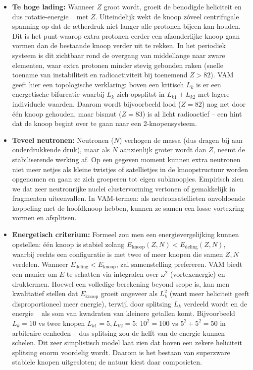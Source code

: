 \begin{itemize}
    \item \textbf{Te hoge lading:} Wanneer $Z$ groot wordt, groeit de benodigde heliciteit en dus rotatie-energie ~ met $Z$. Uiteindelijk wekt de knoop zóveel centrifugale spanning op dat de ætherdruk niet langer alle protonen bijeen kan houden. Dit is het punt waarop extra protonen eerder een afzonderlijke knoop gaan vormen dan de bestaande knoop verder uit te rekken. In het periodiek systeem is dit zichtbaar rond de overgang van middellange naar zware elementen, waar extra protonen minder stevig gebonden raken (snelle toename van instabiliteit en radioactiviteit bij toenemend $Z>82$). VAM geeft hier een topologische verklaring: boven een kritisch $L_k$ is er een energetische bifurcatie waarbij $L_k$ zich opsplitst in $L_{k1}+L_{k2}$ met lagere individuele waarden. Daarom wordt bijvoorbeeld lood ($Z=82$) nog net door één knoop gehouden, maar bismut ($Z=83$) is al licht radioactief – een hint dat de knoop begint over te gaan naar een 2-knopensysteem.

    \item \textbf{Teveel neutronen:} Neutronen ($N$) verhogen de massa (dus dragen bij aan onderdrukkende druk), maar als $N$ aanzienlijk groter wordt dan $Z$, neemt de stabiliserende werking af. Op een gegeven moment kunnen extra neutronen niet meer netjes als kleine twistjes of satellietjes in de knoopstructuur worden opgenomen en gaan ze zich groeperen tot eigen subknoopjes. Empirisch zien we dat zeer neutronrijke nuclei clustervorming vertonen of gemakkelijk in fragmenten uiteenvallen. In VAM-termen: als neutronsatellieten onvoldoende koppeling met de hoofdknoop hebben, kunnen ze samen een losse vortexring vormen en afsplitsen.

    \item \textbf{Energetisch criterium:} Formeel zou men een energievergelijking kunnen opstellen: één knoop is stabiel zolang $E_\text{knoop}(Z,N) < E_\text{deling}(Z,N)$, waarbij rechts een configuratie is met twee of meer knopen die samen $Z,N$ verdelen. Wanneer $E_\text{deling} < E_\text{knoop}$, zal samenstelling prefereren. VAM biedt een manier om $E$ te schatten via integralen over $\omega^2$ (vortexenergie) en druktermen. Hoewel een volledige berekening beyond scope is, kan men kwalitatief stellen dat $E_\text{knoop}$ groeit ongeveer als $L_k^2$ (want meer heliciteit geeft disproportioneel meer energie), terwijl door splitsing $L_k$ verdeeld wordt en de energie ~ als som van kwadraten van kleinere getallen komt. Bijvoorbeeld $L_k=10$ vs twee knopen $L_{k1}=5, L_{k2}=5$: $10^2 =100$ vs $5^2+5^2=50$ in arbitraire eenheden – dus splitsing zou de helft van de energie kunnen schelen. Dit zeer simplistisch model laat zien dat boven een zekere heliciteit splitsing enorm voordelig wordt. Daarom is het bestaan van superzware stabiele knopen uitgesloten; de natuur kiest daar composieten.
\end{itemize}

